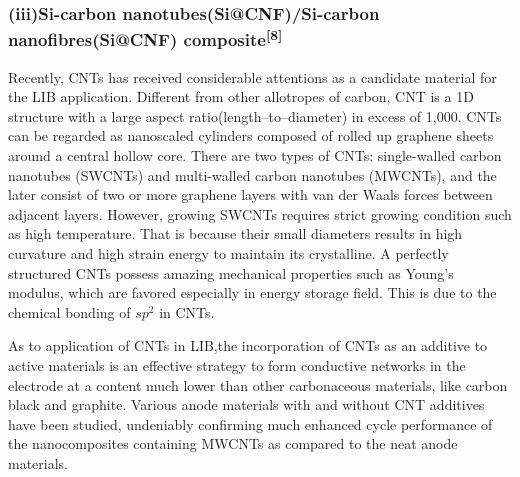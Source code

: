 \subsubsection{(iii)Si-carbon nanotubes(Si@CNF)/Si-carbon nanofibres(Si@CNF) composite\textsuperscript{[8]}}
Recently, CNTs has received considerable attentions as a candidate material for the LIB application. Different from other allotropes of carbon, CNT is a 1D structure with a large aspect ratio(length--to--diameter) in excess of 1,000. CNTs can be regarded as nanoscaled cylinders composed of rolled up graphene sheets around a central hollow core. There are two types of CNTs: single-walled carbon nanotubes (SWCNTs) and multi-walled carbon nanotubes (MWCNTs), and the later consist of two or more graphene layers with van der Waals forces between adjacent layers. However, growing  SWCNTs requires strict growing condition such as high temperature. That is because their small diameters results in high curvature and high strain energy to maintain its crystalline. A perfectly structured CNTs possess amazing mechanical properties such as Young’s modulus, which are favored especially in energy storage field. This is due to the chemical bonding of $sp^{2}$ in CNTs. 

As to application of CNTs in LIB,the incorporation of CNTs as an additive to active materials is an effective strategy to form conductive networks in the electrode at a content much lower than other carbonaceous materials, like carbon black and graphite. Various anode materials with and without CNT additives have been studied, undeniably conﬁrming much enhanced cycle performance of the nanocomposites containing MWCNTs as compared to the neat anode materials.

